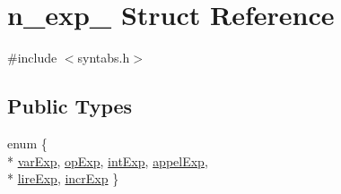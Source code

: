\hypertarget{structn__exp__}{}\section{n\+\_\+exp\+\_\+ Struct Reference}
\label{structn__exp__}


{\ttfamily \#include $<$syntabs.\+h$>$}

\subsection*{Public Types}
\begin{DoxyCompactItemize}
\item 
enum \{ \\*
\hyperlink{structn__exp___ae137d0654317b7ad0e3eba2a11e27c83a12e72501f4d8cfd5fee83ac87456788d}{var\+Exp}, 
\hyperlink{structn__exp___ae137d0654317b7ad0e3eba2a11e27c83af23fd217859651cb6b6f4bc18454c689}{op\+Exp}, 
\hyperlink{structn__exp___ae137d0654317b7ad0e3eba2a11e27c83ac4629f221aaab0de299cb93c31c95c50}{int\+Exp}, 
\hyperlink{structn__exp___ae137d0654317b7ad0e3eba2a11e27c83ab311f07ff152fdeb7246e48e393e97b0}{appel\+Exp}, 
\\*
\hyperlink{structn__exp___ae137d0654317b7ad0e3eba2a11e27c83a2d8a01a385eb8df0561ff590bd008e61}{lire\+Exp}, 
\hyperlink{structn__exp___ae137d0654317b7ad0e3eba2a11e27c83a0cb424b7ed53c974f44c7900833bd2db}{incr\+Exp}
 \}
\end{DoxyCompactItemize}
